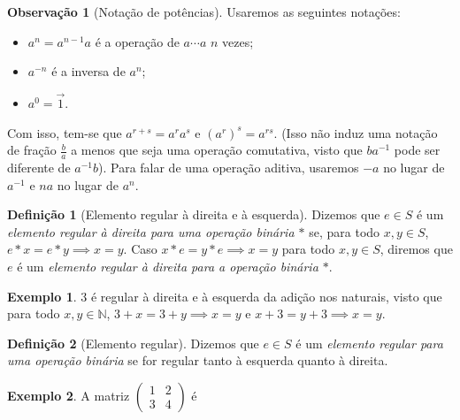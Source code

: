 \documentclass[a4paper,12pt]{article}
\theoremstyle{plain}
\theoremstyle{definition}
\newtheorem{definicao}{Definição}[section]
\newtheorem{observacao}{Observação}[section]
\newtheorem{exemplo}{Exemplo}[section]
\begin{document}
\begin{observacao}[Notação de potências]
	Usaremos as seguintes notações:
	\begin{itemize}
		\item \(a^n = a^{n-1}a\) é a operação de \(a\dotsb a\) \(n\) vezes;
		\item \(a^{-n}\) é a inversa de \(a^n\);
		\item \(a^0 = \vec{1}\).
	\end{itemize}
	Com isso, tem-se que \(a^{r+s} = a^ra^s\) e \((a^r)^s = a^{rs}\). (Isso
	não induz uma notação de fração \(\frac{b}{a}\) a menos que seja uma operação
	comutativa, visto que \(ba^{-1}\) pode ser diferente de \(a^{-1}b\)).
	Para falar de uma operação aditiva, usaremos \(-a\) no lugar de
	\(a^{-1}\) e \(na\) no lugar de \(a^n\).
\end{observacao}

\begin{definicao}[Elemento regular à direita e à esquerda]
	Dizemos que \(e\in S\) é um \emph{elemento regular à direita para uma operação binária $*$} se, para todo $x,y \in S$, \(e*x = e*y \implies x = y\). Caso \(x*e = y*e \implies x = y\) para todo $x,y\in S$, diremos que $e$ é um \emph{elemento regular à direita para a operação binária $*$}.
\end{definicao}

\begin{exemplo}
	$3$ é regular à direita e à esquerda da adição nos naturais, visto que para todo $x,y\in \mathbb{N}$, $3+x = 3 + y \implies x = y$ e $x + 3 = y+3 \implies x =y$.
\end{exemplo}

\begin{definicao}[Elemento regular]
	Dizemos que \(e\in S\) é um \emph{elemento regular para uma operação binária} se for regular tanto à esquerda quanto à direita.
\end{definicao}

\begin{exemplo}
	A matriz $\begin{pmatrix}
		1&2\\
		3&4
	\end{pmatrix}$ é 
\end{exemplo}


{}



\end{document}
